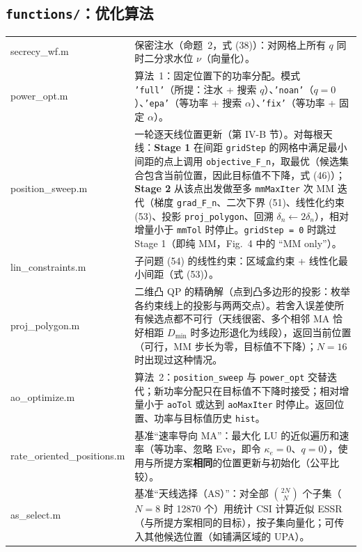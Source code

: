 \documentclass[11pt,a4paper]{ctexart}
\newcommand{\code}[1]{\texttt{#1}}
\begin{document}
\subsection{\code{functions/}：优化算法}
\begin{longtable}{>{\ttfamily\small}p{4.6cm}p{11.2cm}}
\toprule
secrecy\_wf.m & 保密注水（命题~2，式 (38)）：对网格上所有 $q$ 同时二分求水位 $\nu$（向量化）。\\
power\_opt.m & 算法~1：固定位置下的功率分配。模式 \code{'full'}（所提：注水 + 搜索 $q$）、\code{'noan'}（$q=0$）、\code{'epa'}（等功率 + 搜索 $\alpha$）、\code{'fix'}（等功率 + 固定 $\alpha$）。\\
position\_sweep.m & 一轮逐天线位置更新（第 IV-B 节）。对每根天线：\textbf{Stage 1} 在间距 \code{gridStep} 的网格中满足最小间距的点上调用 \code{objective\_F\_n}，取最优（候选集合包含当前位置，因此目标值不下降，式 (46)）；\textbf{Stage 2} 从该点出发做至多 \code{mmMaxIter} 次 MM 迭代（梯度 \code{grad\_F\_n}、二次下界 (51)、线性化约束 (53)、投影 \code{proj\_polygon}、回溯 $\delta_n\leftarrow2\delta_n$），相对增量小于 \code{mmTol} 时停止。\code{gridStep = 0} 时跳过 Stage 1（即纯 MM，Fig.~4 中的 “MM only”）。\\
lin\_constraints.m & 子问题 (54) 的线性约束：区域盒约束 + 线性化最小间距（式 (53)）。\\
proj\_polygon.m & 二维凸 QP 的精确解（点到凸多边形的投影：枚举各约束线上的投影与两两交点）。若舍入误差使所有候选点都不可行（天线很密、多个相邻 MA 恰好相距 $D_{\min}$ 时多边形退化为线段），返回当前位置（可行，MM 步长为零，目标值不下降）；$N=16$ 时出现过这种情况。\\
ao\_optimize.m & 算法~2：\code{position\_sweep} 与 \code{power\_opt} 交替迭代；新功率分配只在目标值不下降时接受；相对增量小于 \code{aoTol} 或达到 \code{aoMaxIter} 时停止。返回位置、功率与目标值历史 \code{hist}。\\
rate\_oriented\_positions.m & 基准“速率导向 MA”：最大化 LU 的近似遍历和速率（等功率、忽略 Eve，即令 $\kappa_e=0$、$q=0$），使用与所提方案\textbf{相同}的位置更新与初始化（公平比较）。\\
as\_select.m & 基准“天线选择（AS）”：对全部 $\binom{2N}{N}$ 个子集（$N=8$ 时 12870 个）用统计 CSI 计算近似 ESSR（与所提方案相同的目标），按子集向量化；可传入其他候选位置（如铺满区域的 UPA）。\\
\bottomrule
\end{longtable}
\end{document}
